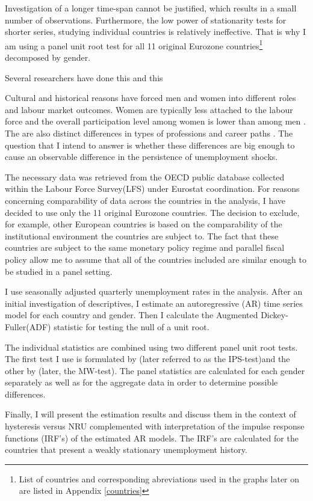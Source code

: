 \documentclass[12pt,a4paper,english]{article}
\begin{document}
Investigation of a longer time-span cannot be justified, which results in a small number of observations. Furthermore, the low power of stationarity tests for shorter series, studying individual countries is relatively ineffective. That is why I am using a panel unit root test for all 11 original Eurozone countries\footnote{List of countries and corresponding abreviations used in the graphs later on are listed in Appendix \ref{countries}} decomposed by gender. 

Several researchers have done this and this

Cultural and historical reasons have forced men and women into different roles and labour market outcomes. Women are typically less attached to the labour force and the overall participation level among women is lower than among men \citep{gonzalo2000}. The are also distinct differences in types of professions and career paths \citep{arulampalam2007,blau2003}. The question that I intend to answer is whether these differences are big enough to cause an observable difference in the persistence of unemployment shocks.

The necessary data was retrieved from the OECD public database collected within the Labour Force Survey(LFS) under Eurostat coordination. For reasons concerning comparability of data across the countries in the analysis, I have decided to use only the 11 original Eurozone countries. The decision to exclude, for example, other European countries is based on the comparability of the institutional environment the countries are subject to. The fact that these countries are subject to the same monetary policy regime and parallel fiscal policy allow me to assume that all of the countries included are similar enough to be studied in a panel setting.

I use seasonally adjusted quarterly unemployment rates in the analysis. After an initial investigation of descriptives, I estimate an autoregressive (AR) time series model for each country and gender. Then I calculate the Augmented Dickey-Fuller(ADF) statistic for testing the null of a unit root. 

The individual statistics are combined using two different panel unit root tests. The first test I use is formulated by \cite{im2003} (later referred to as the IPS-test)and the other by \cite{maddala1999} (later, the MW-test). The panel statistics are calculated for each gender separately as well as for the aggregate data in order to determine possible differences.

Finally, I will present the estimation results and discuss them in the context of hysteresis versus NRU complemented with interpretation of the impulse response functions (IRF's) of the estimated AR models. The IRF's are calculated for the countries that present a weakly stationary unemployment history.
\end{document}
